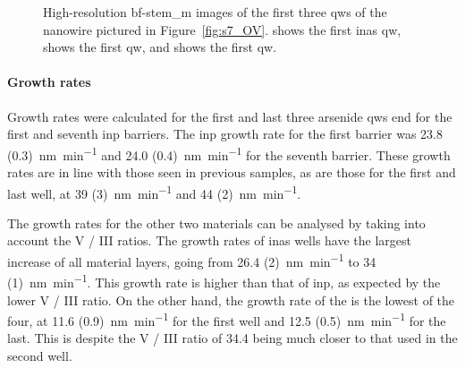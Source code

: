 \begin{figure}
{
    }
    \caption[High-resolution \acs{bf}-\acs{stem_m} images of the first three \acl{qw}s of the nanowire cross-section from sample 7.]{High-resolution \acs{bf}-\acs{stem_m} images of the first three \acl{qw}s of the nanowire pictured in Figure~\ref{fig:s7_OV}.  shows the first \acs{inas} \acl{qw},  shows the first  \acl{qw}, and  shows the first  \acl{qw}.}
    \label{fig:s7_well1-3_HR}
\end{figure}

\paragraph{Growth rates} Growth rates were calculated for the first and last three arsenide \acl{qw}s end for the first and seventh \acs{inp} barriers. The \acs{inp} growth rate for the first barrier was \qty[separate-uncertainty=true]{23.8 (0.3)}{\nano\metre\per\minute} and \qty[separate-uncertainty=true]{24.0 (0.4)}{\nano\metre\per\minute} for the seventh barrier. These growth rates are in line with those seen in previous samples, as are those for the first and last  well, at \qty[separate-uncertainty=true]{39 (3)}{\nano\metre\per\minute} and \qty[separate-uncertainty=true]{44 (2)}{\nano\metre\per\minute}.

The growth rates for the other two materials can be analysed by taking into account the V / III ratios. The growth rates of \acs{inas} wells have the largest increase of all material layers, going from \qty[separate-uncertainty=true]{26.4 (2)}{\nano\metre\per\minute} to \qty[separate-uncertainty=true]{34 (1)}{\nano\metre\per\minute}. This growth rate is higher than that of \acs{inp}, as expected by the lower V / III ratio. On the other hand, the growth rate of the  is the lowest of the four, at \qty[separate-uncertainty=true]{11.6 (0.9)}{\nano\metre\per\minute} for the first well and \qty[separate-uncertainty=true]{12.5 (0.5)}{\nano\metre\per\minute} for the last. This is despite the V / III ratio of \num{34.4} being much closer to that used in the second well.  

